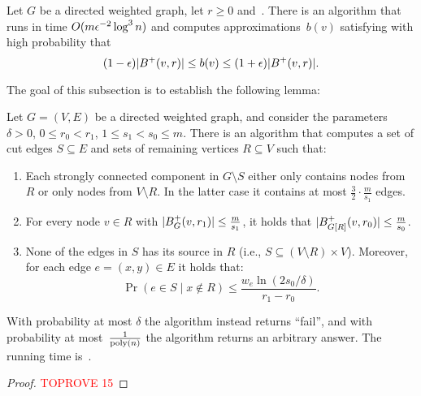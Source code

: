 \documentclass[letterpaper,11pt]{article}
\begin{document}
\begin{lemma} \label{lem:cohen}
Let $G$ be a directed weighted graph, let $r \geq 0$ and~. There is an algorithm that runs in time $O(m \epsilon^{-2} \log^3 n)$ and computes approximations~$b(v)$ satisfying with high probability that
\begin{equation*}
    (1 - \epsilon) |B^+(v, r)| \leq b(v) \leq (1 + \epsilon) |B^+(v, r)|.
\end{equation*}
\end{lemma}

The goal of this subsection is to establish the following lemma:

\begin{lemma} \label{lem:cut-light}
Let $G = (V, E)$ be a directed weighted graph, and consider the parameters $\delta > 0$, $0 \leq r_0 < r_1$, $1 \leq s_1 < s_0 \leq m$. There is an algorithm that computes a set of cut edges $S \subseteq E$ and sets of remaining vertices $R \subseteq V$ such that:
\begin{enumerate}[label=(\roman*)]
    \item Each strongly connected component in $G \setminus S$ either only contains nodes from $R$ or only nodes from $V \setminus R$. In the latter case it contains at most $\frac32 \cdot \frac{m}{s_1}$ edges.
    \item For every node $v \in R$ with $|B^+_G(v, r_1)| \leq \frac{m}{s_1}$, it holds that $|B^+_{G[R]}(v, r_0)| \leq \frac{m}{s_0}$.
    \item None of the edges in $S$ has its source in $R$ (i.e., $S \subseteq (V \setminus R) \times V$). Moreover, for each edge $e = (x, y) \in E$ it holds that:
    \begin{equation*}
        \Pr(e \in S \mid x \not\in R) \leq \frac{w_e \ln(2s_0 / \delta)}{r_1 - r_0}.
    \end{equation*}
\end{enumerate}
With probability at most $\delta$ the algorithm instead returns ``fail'', and with probability at most~$\frac{1}{\operatorname{\text{{\rm poly}}}(n)}$ the algorithm returns an arbitrary answer. The running time is~.
\end{lemma}

\begin{proof}\textcolor{red}{TOPROVE 15}\end{proof}
\end{document}

